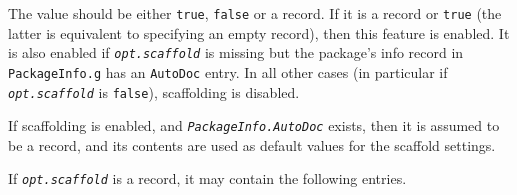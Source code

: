 \documentclass[a4paper,11pt]{report}
\begin{document}
{{{\begin{description}
\begin{description}
 The value should be either \texttt{true}, \texttt{false} or a record. If it is a record or \texttt{true} (the latter is equivalent to specifying an empty record), then this feature is
enabled. It is also enabled if \mbox{\texttt{\mdseries\slshape opt.scaffold}} is missing but the package's info record in \texttt{PackageInfo.g} has an \texttt{AutoDoc} entry. In all other cases (in particular if \mbox{\texttt{\mdseries\slshape opt.scaffold}} is \texttt{false}), scaffolding is disabled. 

 If scaffolding is enabled, and \mbox{\texttt{\mdseries\slshape PackageInfo.AutoDoc}} exists, then it is assumed to be a record, and its contents are used as
default values for the scaffold settings. 

 

 If \mbox{\texttt{\mdseries\slshape opt.scaffold}} is a record, it may contain the following entries. 


\end{description}
\end{description}}}}
\end{document}
